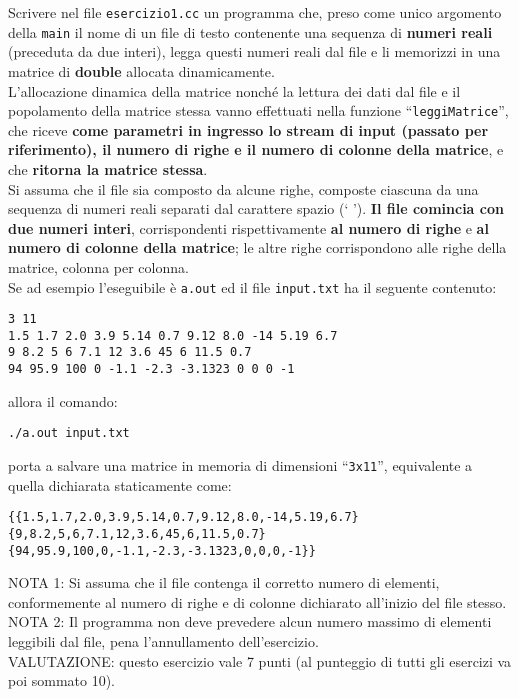 
%

Scrivere nel file {\tt esercizio1.cc} un programma che, 
preso come unico argomento della \texttt{main} il nome di un file di testo
contenente una sequenza di \textbf{numeri reali} (preceduta da due interi), legga questi
numeri reali dal file
e li memorizzi in una matrice di \textbf{double} allocata dinamicamente.\\

L'allocazione dinamica della matrice nonch\'e la lettura dei dati dal file
e il popolamento della matrice stessa vanno effettuati nella funzione
``\texttt{leggiMatrice}'', che riceve \textbf{come parametri in ingresso
lo stream di input (passato per riferimento), il numero di righe e 
il numero di colonne della matrice}, e che \textbf{ritorna la matrice stessa}.\\

Si assuma che il file sia composto da alcune righe, composte ciascuna
da una sequenza di numeri reali separati dal carattere spazio (` ').
\textbf{Il file comincia con due numeri interi}, corrispondenti rispettivamente
\textbf{al numero di righe} e \textbf{al numero di colonne della matrice};
le altre righe corrispondono alle righe della matrice, colonna per colonna.\\

\noindent
Se ad esempio l'eseguibile \`e \texttt{a.out} ed il file 
\texttt{input.txt} ha il seguente contenuto:
\begin{verbatim}
3 11
1.5 1.7 2.0 3.9 5.14 0.7 9.12 8.0 -14 5.19 6.7
9 8.2 5 6 7.1 12 3.6 45 6 11.5 0.7
94 95.9 100 0 -1.1 -2.3 -3.1323 0 0 0 -1
\end{verbatim}
allora il comando:

\begin{verbatim}
./a.out input.txt
\end{verbatim}
\noindent
porta a salvare una matrice in memoria di dimensioni ``{\tt 3x11}'',
equivalente a quella dichiarata staticamente come:
\begin{verbatim}
{{1.5,1.7,2.0,3.9,5.14,0.7,9.12,8.0,-14,5.19,6.7}
{9,8.2,5,6,7.1,12,3.6,45,6,11.5,0.7}
{94,95.9,100,0,-1.1,-2.3,-3.1323,0,0,0,-1}}
\end{verbatim}

\vspace{.3cm}

NOTA 1:
Si assuma che il file contenga il corretto numero di elementi,
conformemente al numero di righe e di colonne dichiarato
all'inizio del file stesso.\\

NOTA 2:
Il programma non deve prevedere alcun numero massimo di elementi 
leggibili dal file, pena l'annullamento dell'esercizio.\\

VALUTAZIONE:
questo esercizio vale 7 punti (al punteggio di tutti gli esercizi va poi sommato 10).

%
